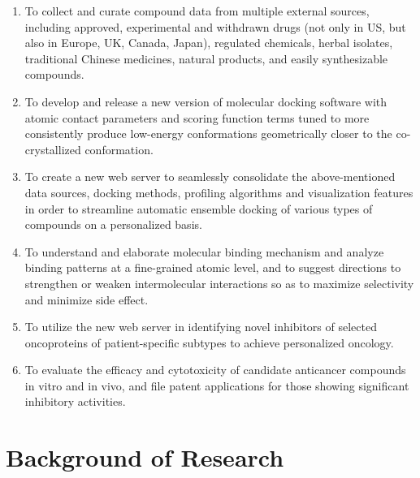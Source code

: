 \documentclass[a4paper,12pt]{article}
\begin{document}
\begin{enumerate}
  \item To collect and curate compound data from multiple external sources, including approved, experimental and withdrawn drugs (not only in US, but also in Europe, UK, Canada, Japan), regulated chemicals, herbal isolates, traditional Chinese medicines, natural products, and easily synthesizable compounds.\label{objective:cdata}
  \item To develop and release a new version of molecular docking software with atomic contact parameters and scoring function terms tuned to more consistently produce low-energy conformations geometrically closer to the co-crystallized conformation.\label{objective:idock}
  \item To create a new web server to seamlessly consolidate the above-mentioned data sources, docking methods, profiling algorithms and visualization features in order to streamline automatic ensemble docking of various types of compounds on a personalized basis.\label{objective:edock}
  \item To understand and elaborate molecular binding mechanism and analyze binding patterns at a fine-grained atomic level, and to suggest directions to strengthen or weaken intermolecular interactions so as to maximize selectivity and minimize side effect.\label{objective:iview}
  \item To utilize the new web server in identifying novel inhibitors of selected oncoproteins of patient-specific subtypes to achieve personalized oncology.\label{objective:edockapp}
  \item To evaluate the efficacy and cytotoxicity of candidate anticancer compounds in vitro and in vivo, and file patent applications for those showing significant inhibitory activities.\label{objective:wetval}
\end{enumerate}

\section*{Background of Research}
\end{document}
